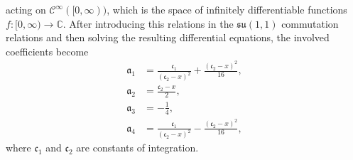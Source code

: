 \documentclass[12pt,a4paper]{report}
\theoremstyle{definition}
\theoremstyle{remark}
\theoremstyle{remark}
\begin{document}
acting on $\mathcal{C}^\infty([0,\infty))$, which is the space of infinitely differentiable functions $f:[0,\infty)\rightarrow\mathbb{C}$. 
After introducing this relations in the $\mathfrak{su}(1,1)$ commutation relations and then solving the resulting differential equations, the involved coefficients become \cite{treatise}
\begin{align*}
\mathfrak{a}_1&=\frac{\mathfrak{c}_1}{(\mathfrak{c}_2-x)^2}+\frac{(\mathfrak{c}_2-x)^2}{16},\\
\mathfrak{a}_2&=\frac{\mathfrak{c}_2-x}{2},\\
\mathfrak{a}_3&=-\frac{1}{4},\\
\mathfrak{a}_4&=\frac{\mathfrak{c}_1}{(\mathfrak{c}_2-x)^2}-\frac{(\mathfrak{c}_2-x)^2}{16},
\end{align*}
where $\mathfrak{c}_1$ and $\mathfrak{c}_2$ are constants of integration.
\end{document}
